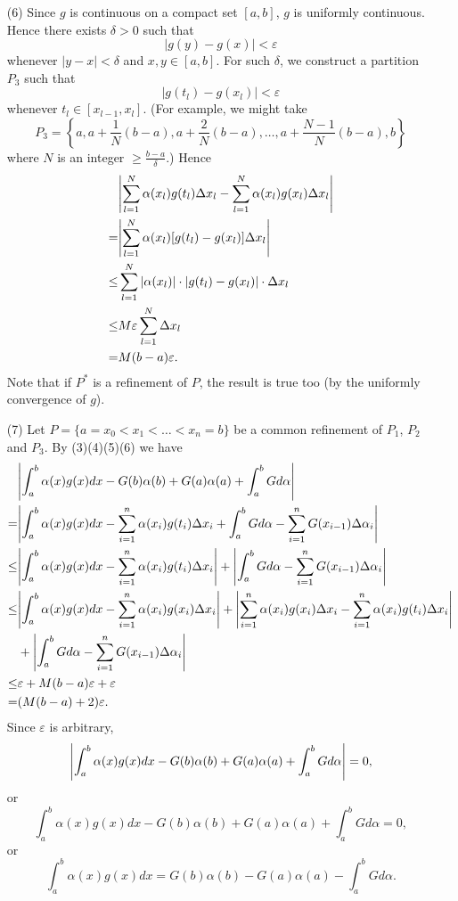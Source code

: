 \documentclass{article}
\begin{document}
\begin{enumerate}
  \item[(6)]
  Since $g$ is continuous on a compact set $[a,b]$,
  $g$ is uniformly continuous.
  Hence there exists $\delta > 0$ such that
  \[
    |g(y) - g(x)| < \varepsilon
  \]
  whenever $|y - x| < \delta$ and $x, y \in [a,b]$.
  For such $\delta$, we construct a partition $P_3$ such that
  \[
    |g(t_l) - g(x_l)| < \varepsilon
  \]
  whenever $t_l \in [x_{l-1},x_l]$.
  (For example, we might take
  \[
    P_3 = \left\{
      a, a + \frac{1}{N}(b-a), a + \frac{2}{N}(b-a), \ldots,
      a + \frac{N-1}{N}(b-a), b
    \right\}
  \]
  where $N$ is an integer $\geq \frac{b-a}{\delta}$.)
  Hence
  \begin{align*}
    &\abs{ \sum_{l=1}^{N} \alpha(x_l)g(t_l) \Delta x_l
      - \sum_{l=1}^{N} \alpha(x_l)g(x_l) \Delta x_l } \\
    =&
    \abs{ \sum_{l=1}^{N} \alpha(x_l)[g(t_l)-g(x_l)] \Delta x_l } \\
    \leq&
    \sum_{l=1}^{N} |\alpha(x_l)| \cdot |g(t_l)-g(x_l)| \cdot \Delta x_l \\
    \leq&
    M \varepsilon \sum_{l=1}^{N} \Delta x_l \\
    =&
    M(b-a) \varepsilon.
  \end{align*}
  Note that if $P^{*}$ is a refinement of $P$, the result is true too
  (by the uniformly convergence of $g$).

  \item[(7)]
  Let $P = \{a = x_0 < x_1 < \ldots < x_n = b\}$
  be a common refinement of $P_1$, $P_2$ and $P_3$.
  By (3)(4)(5)(6) we have
  \begin{align*}
    &\abs{ \int_{a}^{b} \alpha(x)g(x)dx
      - G(b)\alpha(b) + G(a)\alpha(a) + \int_{a}^{b}G d\alpha } \\
    =& \abs{
      \int_{a}^{b} \alpha(x)g(x)dx - \sum_{i=1}^{n} \alpha(x_i)g(t_i)\Delta x_i
      +
      \int_{a}^{b}G d\alpha - \sum_{i=1}^{n} G(x_{i-1}) \Delta\alpha_i } \\
    \leq& \abs{
      \int_{a}^{b} \alpha(x)g(x)dx - \sum_{i=1}^{n} \alpha(x_i)g(t_i)\Delta x_i }
      +
      \abs{ \int_{a}^{b}G d\alpha - \sum_{i=1}^{n} G(x_{i-1}) \Delta\alpha_i } \\
    \leq& \abs{
      \int_{a}^{b} \alpha(x)g(x)dx - \sum_{i=1}^{n} \alpha(x_i)g(x_i)\Delta x_i }
      +
      \abs{ \sum_{i=1}^{n} \alpha(x_i)g(x_i)\Delta x_i
        - \sum_{i=1}^{n} \alpha(x_i)g(t_i)\Delta x_i } \\
      &+
      \abs{ \int_{a}^{b}G d\alpha - \sum_{i=1}^{n} G(x_{i-1}) \Delta\alpha_i } \\
    \leq& \varepsilon + M(b-a)\varepsilon + \varepsilon \\
    =& (M(b-a) + 2)\varepsilon.
  \end{align*}
  Since $\varepsilon$ is arbitrary,
  \[
    \abs{ \int_{a}^{b} \alpha(x)g(x)dx
      - G(b)\alpha(b) + G(a)\alpha(a) + \int_{a}^{b}G d\alpha }=0,
  \]
  or
  \[
    \int_{a}^{b} \alpha(x)g(x)dx
      - G(b)\alpha(b) + G(a)\alpha(a) + \int_{a}^{b}G d\alpha = 0,
  \]
  or
  \[
    \int_{a}^{b} \alpha(x)g(x)dx
    = G(b)\alpha(b) - G(a)\alpha(a) - \int_{a}^{b}G d\alpha.
  \]
\end{enumerate}
\end{document}
